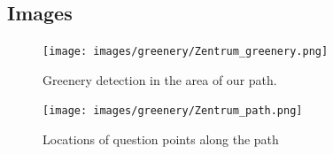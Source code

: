 \documentclass[letterpaper]{article}
\begin{document}
\subsection{Images}
\begin{figure}[htb]
    \centering
    \texttt{[image: images/greenery/Zentrum\_greenery.png]}
    \caption{Greenery detection in the area of our path.}
    \label{fig:path_greenery}
\end{figure}

\begin{figure}[htb]
	\centering
	\texttt{[image: images/greenery/Zentrum\_path.png]}
	\caption{Locations of question points along the path}
	\label{fig:path_points}
\end{figure}
\end{document}
